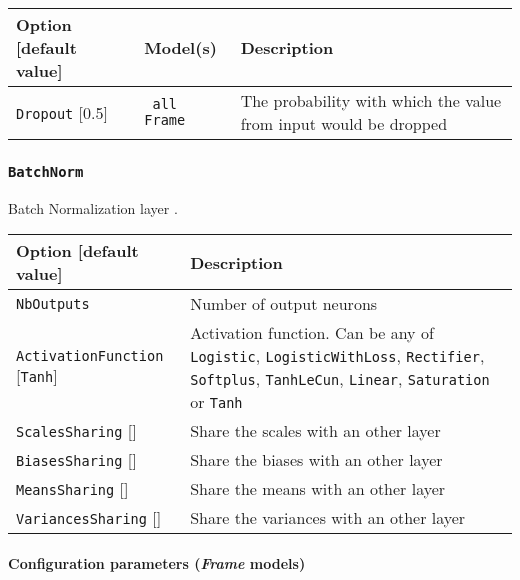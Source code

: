 \documentclass[a4paper,11pt,oneside]{article}
\begin{document}
\begin{center}
 \begin{longtable}{| p{4cm} | p{3cm} | p{9cm} | }
 \hline
 Option [default value] & Model(s) & Description\\
 \hline\hline
  \lstinline!Dropout! [0.5] & \lstinline! all Frame ! & The probability with
  which the value from input would be dropped \\
 \hline
\end{longtable}
\end{center}


\subsubsection{\texorpdfstring{%
\lstinline[basicstyle=\ttfamily\bfseries]!BatchNorm!}{BatchNorm}}
Batch Normalization layer \citep{Ioffe2015}.

\begin{center}
 \begin{longtable}{| p{5cm} | p{10cm} | }
 \hline
 Option [default value] & Description\\
 \hline\hline
  \cellcolor{requiredcolor}\lstinline!NbOutputs! & Number of output neurons \\
  \lstinline!ActivationFunction! [\lstinline!Tanh!] & Activation function.
  Can be any of \lstinline!Logistic!,  \lstinline!LogisticWithLoss!,
  \lstinline!Rectifier!, \lstinline!Softplus!, \lstinline!TanhLeCun!,
  \lstinline!Linear!, \lstinline!Saturation! or \lstinline!Tanh! \\
  \lstinline!ScalesSharing! [] & Share the scales with an other layer \\
  \lstinline!BiasesSharing! [] & Share the biases with an other layer \\
  \lstinline!MeansSharing! [] & Share the means with an other layer \\
  \lstinline!VariancesSharing! [] & Share the variances with an other layer \\
  \hline
\end{longtable}
\end{center}

\paragraph{Configuration parameters (\emph{Frame} models)}
\end{document}
